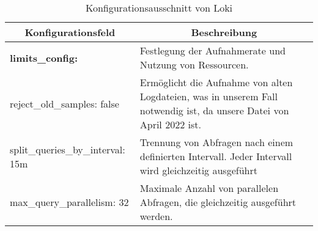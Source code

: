 \begin{table}[H]
  \begin{tabularx}{\textwidth}{|m{6cm}|X|}
  \hline
  \multicolumn{1}{|c|}{\textbf{Konfigurationsfeld}} & \multicolumn{1}{|c|}{\textbf{Beschreibung}} \\
  \hline

  \textbf{limits\_config:} & Festlegung der Aufnahmerate und Nutzung von Ressourcen. \\ 
  \hphantom{te}reject\_old\_samples: false & Ermöglicht die Aufnahme von alten Logdateien, was in unserem Fall notwendig ist, da unsere Datei von April 2022 ist. \\ 
  \hphantom{te}split\_queries\_by\_interval: 15m & Trennung von Abfragen nach einem definierten Intervall. Jeder Intervall wird gleichzeitig ausgeführt \\ 
  \hphantom{te}max\_query\_parallelism: 32 & Maximale Anzahl von parallelen Abfragen, die gleichzeitig ausgeführt werden.  \\ \hline
  
  \end{tabularx}
  \caption[Konfigurationsausschnitt von Loki]
  {Konfigurationsausschnitt von Loki}
  \label{tab:KonfigLoki}
\end{table}


